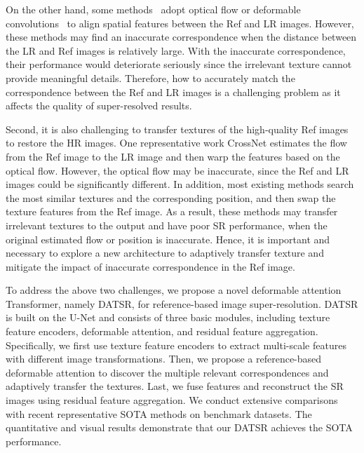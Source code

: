 \documentclass[runningheads]{llncs}
\begin{document}
On the other hand, some methods~\cite{zheng2018crossnet,Shim_2020_CVPR} adopt optical flow or deformable convolutions~\cite{dai2017deformable,zhu2019deformable,chan2021basicvsrpp,wang2019edvr} to align spatial features between the Ref and LR images.
However, these methods may find an inaccurate correspondence when the distance between the LR and Ref images is relatively large.
With the inaccurate correspondence, their performance would deteriorate seriously since the irrelevant texture cannot provide meaningful details. 
Therefore, how to accurately match the correspondence between the Ref and LR images is a challenging problem as it affects the quality of super-resolved results.


Second, it is also challenging to transfer textures of the high-quality Ref images to restore the HR images.
One representative work CrossNet \cite{zheng2018crossnet} estimates the flow from the Ref image to the LR image and then warp the features based on the optical flow.
However, the optical flow may be inaccurate, since the Ref and LR images could be significantly different.
In addition, most existing methods \cite{zhang2019image,yang2020learning,lu2021masa} search the most similar textures and the corresponding position, and then swap the texture features from the Ref image.
As a result, these methods may transfer irrelevant textures to the output and have poor SR performance, when the original estimated flow or position is inaccurate.
Hence, it is important and necessary to explore a new architecture to adaptively transfer texture and mitigate the impact of inaccurate correspondence in the Ref image.

To address the above two challenges, we propose a novel deformable attention Transformer, namely DATSR, for reference-based image super-resolution.
DATSR is built on the U-Net and consists of three basic modules, including texture feature encoders, deformable attention, and residual feature aggregation. 
Specifically, we first use texture feature encoders to extract multi-scale features with different image transformations.
Then, we propose a reference-based deformable attention to discover the multiple relevant correspondences and adaptively transfer the textures.
Last, we fuse features and reconstruct the SR images using residual feature aggregation.
We conduct extensive comparisons with recent representative SOTA methods on benchmark datasets. The quantitative and visual results demonstrate that our DATSR achieves the SOTA performance.
 
\end{document}
